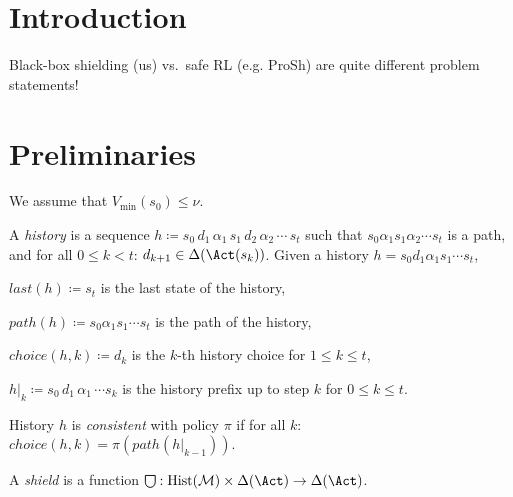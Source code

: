 \documentclass[runningheads]{llncs}
\newcommand{\M}{\mathcal{M}}
\newcommand{\Distr}{\Delta}
\newcommand{\Hist}{\mathrm{Hist}}
\newcommand\shieldbase{%
  \tikz[baseline=0.2ex] \draw[semithick]
    (0,1.75ex) -- (0,0.75ex)
    arc [radius=0.75ex, start angle=-180, end angle=0]
    -- (1.5ex,1.75ex) -- cycle;%
}
\DeclareRobustCommand\shield{%
  \mathord{\scalerel*{\shieldbase}{\bigcirc}}%
}
\newcommand{\hpath}{\mathit{path}}
\newcommand{\last}{\mathit{last}}
\newcommand{\choice}{\mathit{choice}}
\begin{document}
\section{Introduction}

Black-box shielding (us) vs.\ safe RL (e.g. ProSh) are quite different problem statements!

\section{Preliminaries}

We assume that \(V_{\min}(s_0) \leq \nu\).

\begin{definition}[History]
A \emph{history} is a sequence
\(
    h \coloneq s_0 \, d_1 \, \alpha_1 \, s_1 \, d_2 \, \alpha_2 \, \cdots \, s_t
\) such that \(s_0 \alpha_1 s_1 \alpha_2 \cdots s_t\) is a path, and for all \(0 \leq k < t\): \(d_{k+1} \in \Distr(\Act(s_k))\). 
Given a history \(h= s_0 d_1 \alpha_1 s_1 \cdots s_t\),
\begin{compactitem}
    \item \(\last(h) \coloneq s_t\)  is the last state of the history,
    \item \(\hpath(h) \coloneq s_0 \alpha_1 s_1 \cdots s_t\) is the path of the history,
    \item \(\choice(h, k) \coloneq d_{k}\) is the \(k\)-th history choice for \(1 \leq k \leq t\),
    \item \(h|_k \coloneq s_0 \, d_1 \, \alpha_1 \, \cdots s_k\) is the history prefix up to step \(k\) for \(0 \leq k \leq t\).
\end{compactitem}
\end{definition}

History \(h\) is \emph{consistent} with policy \(\pi\) if for all \(k\): \(\choice(h,k) = \pi(\hpath(h|_{k-1}))\).


\begin{definition}[Shield]
    A \emph{shield} is a function \(\shield: \Hist(\M) \times \Distr(\Act) \rightarrow \Distr(\Act)\).
\end{definition}
\end{document}
